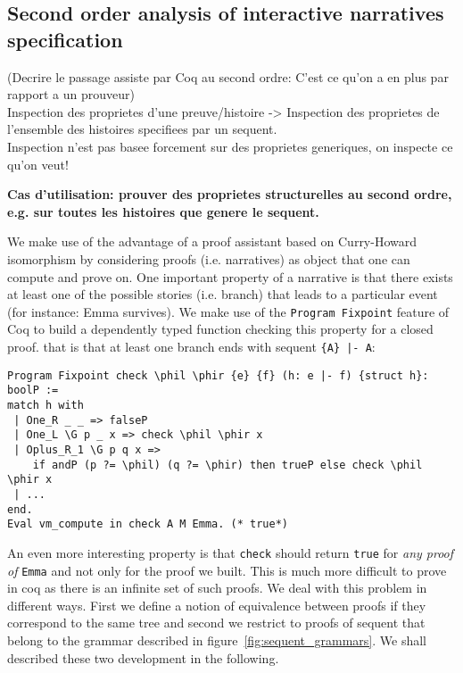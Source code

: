 \documentclass[runningheads,a4paper]{llncs}
\begin{document}




\subsection{Second order analysis of interactive narratives specification}
\label{sec:second-order-analys}
(Decrire le passage assiste par Coq au second ordre: C'est ce qu'on a en plus par rapport a un prouveur)
\\
Inspection des proprietes d'une preuve/histoire -> Inspection des proprietes de l'ensemble des histoires specifiees par un sequent.\\
Inspection n'est pas basee forcement sur des proprietes generiques, on inspecte ce qu'on veut!

\textbf{Cas d'utilisation: prouver des proprietes structurelles au second ordre, e.g. sur toutes les histoires que genere le sequent.}

We make use of the advantage of a proof assistant based on
Curry-Howard isomorphism by considering proofs (i.e. narratives) as
object that one can compute and prove on. One
important property of a narrative is that there exists at
least one of the possible stories (i.e. branch) that leads to a
particular event (for instance: Emma survives). We make use of the
\texttt{Program Fixpoint} feature of Coq to build a dependently typed
function checking this property for a closed proof. that is that at
least one branch ends with sequent \lstinline!{A} |- A!:
\begin{lstlisting}
Program Fixpoint check \phil \phir {e} {f} (h: e |- f) {struct h}: boolP := 
match h with
 | One_R _ _ => falseP
 | One_L \G p _ x => check \phil \phir x
 | Oplus_R_1 \G p q x =>
    if andP (p ?= \phil) (q ?= \phir) then trueP else check \phil \phir x
 | ...
end.
Eval vm_compute in check A M Emma. (* true*)
\end{lstlisting}

An even more interesting property is that \texttt{check} should return
\texttt{true} for \emph{any proof of} \texttt{Emma} and not only for
the proof we built. This is much more difficult to prove in coq as
there is an infinite set of such proofs. We deal with this problem in
different ways. First we define a notion of equivalence between proofs
if they correspond to the same tree and second we restrict to proofs
of sequent that belong to the grammar described in
figure~\ref{fig:sequent_grammars}. We shall described these two
development in the following.
\end{document}

